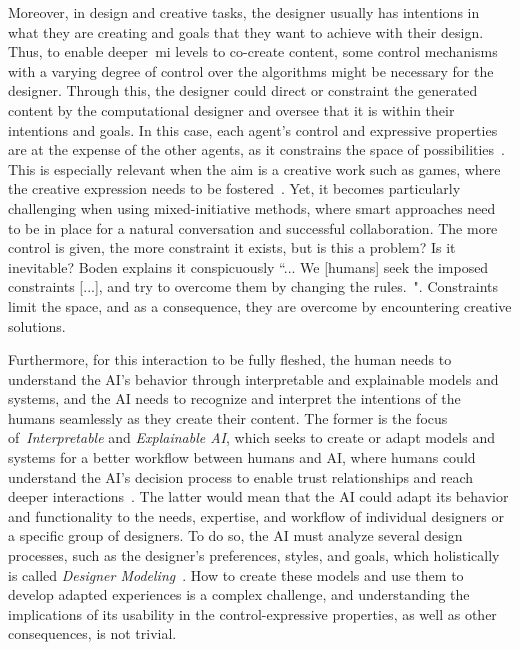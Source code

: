 Moreover, in design and creative tasks, the designer usually has intentions in what they are creating and goals that they want to achieve with their design. Thus, to enable deeper~\acrshort{mi} levels to co-create content, some control mechanisms with a varying degree of control over the algorithms might be necessary for the designer. Through this, the designer could direct or constraint the generated content by the computational designer and oversee that it is within their intentions and goals. In this case, each agent's control and expressive properties are at the expense of the other agents, as it constrains the space of possibilities~\cite{Baldwin2017}. This is especially relevant when the aim is a creative work such as games, where the creative expression needs to be fostered~\cite{Alvarez2018}. Yet, it becomes particularly challenging when using mixed-initiative methods, where smart approaches need to be in place for a natural conversation and successful collaboration. The more control is given, the more constraint it exists, but is this a problem? Is it inevitable? Boden explains it conspicuously ``...  We [humans] seek the imposed constraints [...], and try to overcome them by changing the rules.~\cite{boden2004-creative}". Constraints limit the space, and as a consequence, they are overcome by encountering creative solutions.

Furthermore, for this interaction to be fully fleshed, the human needs to understand the AI's behavior through interpretable and explainable models and systems, and the AI needs to recognize and interpret the intentions of the humans seamlessly as they create their content. The former is the focus of~\emph{Interpretable} and \emph{Explainable AI}, which seeks to create or adapt models and systems for a better workflow between humans and AI, where humans could understand the AI's decision process to enable trust relationships and reach deeper interactions~\cite{Zhu2018-XAIDesignersMICC,Doshi-Velez2018,adadi2018peeking}. The latter would mean that the AI could adapt its behavior and functionality to the needs, expertise, and workflow of individual designers or a specific group of designers. To do so, the AI must analyze several design processes, such as the designer's preferences, styles, and goals, which holistically is called \emph{Designer Modeling}~\cite{Liapis2013-designerModel,Liapis2014-designerModelImpl}. How to create these models and use them to develop adapted experiences is a complex challenge, and understanding the implications of its usability in the control-expressive properties, as well as other consequences, is not trivial.

